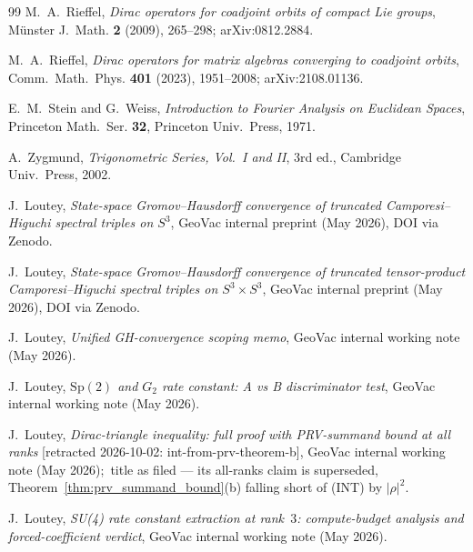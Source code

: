 \documentclass[11pt,a4paper]{article}
\theoremstyle{plain}
\theoremstyle{definition}
\newcommand{\Sp}{\mathrm{Sp}}
\begin{document}
\begin{thebibliography}{99}
M.~A.~Rieffel,
\newblock \emph{Dirac operators for coadjoint orbits of compact Lie
groups},
\newblock M\"unster J.~Math. \textbf{2} (2009), 265--298;
\newblock arXiv:0812.2884.

M.~A.~Rieffel,
\newblock \emph{Dirac operators for matrix algebras converging to
coadjoint orbits},
\newblock Comm.~Math.~Phys. \textbf{401} (2023), 1951--2008;
\newblock arXiv:2108.01136.

E.~M.~Stein and G.~Weiss,
\newblock \emph{Introduction to Fourier Analysis on Euclidean Spaces},
\newblock Princeton Math.~Ser. \textbf{32}, Princeton Univ.~Press, 1971.

A.~Zygmund,
\newblock \emph{Trigonometric Series, Vol.~I and II},
\newblock 3rd ed., Cambridge Univ.~Press, 2002.

J.~Loutey,
\newblock \emph{State-space Gromov--Hausdorff convergence of truncated
Camporesi--Higuchi spectral triples on $S^3$},
\newblock GeoVac internal preprint (May 2026), DOI via Zenodo.

J.~Loutey,
\newblock \emph{State-space Gromov--Hausdorff convergence of truncated
tensor-product Camporesi--Higuchi spectral triples on $S^3 \times S^3$},
\newblock GeoVac internal preprint (May 2026), DOI via Zenodo.

J.~Loutey,
\newblock \emph{Unified GH-convergence scoping memo},
\newblock GeoVac internal working note (May 2026).

J.~Loutey,
\newblock \emph{$\Sp(2)$ and $G_2$ rate constant: A vs B discriminator test},
\newblock GeoVac internal working note (May 2026).

J.~Loutey,
\newblock \emph{Dirac-triangle inequality: full proof with PRV-summand
bound at all ranks} [retracted 2026-10-02: int-from-prv-theorem-b],
\newblock GeoVac internal working note (May 2026);\ title as filed --- its
all-ranks claim is superseded, Theorem~\ref{thm:prv_summand_bound}(b)
falling short of (INT) by $|\rho|^2$.

J.~Loutey,
\newblock \emph{SU(4) rate constant extraction at rank~$3$:
compute-budget analysis and forced-coefficient verdict},
\newblock GeoVac internal working note (May 2026).


\end{thebibliography}
\end{document}
